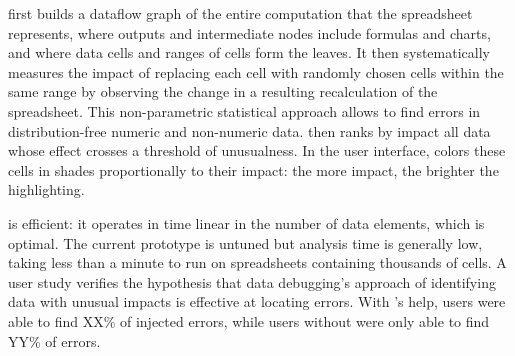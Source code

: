 \checkcell{} first builds a dataflow graph 
of the entire computation that the spreadsheet represents, where outputs
and intermediate nodes include formulas and charts, and where data
cells and ranges of cells form the leaves. It then systematically measures the impact of
replacing each cell with randomly chosen cells within the same range
by observing the change in a resulting recalculation of the
spreadsheet. This non-parametric statistical approach
allows \checkcell{} to find errors in distribution-free numeric and
non-numeric data. \checkcell{} then ranks by impact all data whose
effect crosses a threshold of unusualness. In the user
interface, \checkcell{} colors these cells in shades proportionally to
their impact: the more impact, the brighter the highlighting.

\checkcell{} is efficient: it operates in time linear in the number
of data elements, which is optimal. The current prototype is untuned
but analysis time is generally low, taking less than a minute to run
on spreadsheets containing thousands of cells. A user study verifies
the hypothesis that data debugging's approach of identifying data with
unusual impacts is effective at locating errors. With \checkcell{}'s
help, users were able to find XX\% of injected errors, while users
without \checkcell{} were only able to find YY\% of errors.


